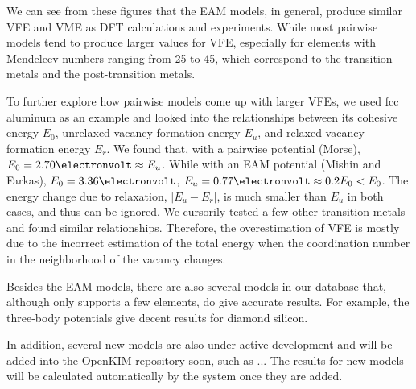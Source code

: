 \documentclass[%
 reprint,
 amsmath,amssymb,
 aps,
]{revtex4-1}
\begin{document}
We can see from these figures that the EAM models, in general, produce similar VFE and VME as DFT calculations and experiments.
While most pairwise models tend to produce larger values for VFE, especially for elements with Mendeleev numbers ranging from 25 to 45, which correspond to the transition metals and the post-transition metals.

To further explore how pairwise models come up with larger VFEs, we used fcc aluminum as an example and looked into the relationships between its cohesive energy $E_0$, unrelaxed vacancy formation energy $E_u$, and relaxed vacancy formation energy $E_r$.
We found that, with a pairwise potential (Morse), $E_0 = 2.70\electronvolt \approx E_u$.
While with an EAM potential (Mishin and Farkas), $E_0 = 3.36\electronvolt$, $E_u = 0.77\electronvolt \approx 0.2E_0 < E_0$.
The energy change due to relaxation, $|E_u-E_r|$, is much smaller than $E_u$ in both cases, and thus can be ignored.
We cursorily tested a few other transition metals and found similar relationships.
Therefore, the overestimation of VFE is mostly due to the incorrect estimation of the total energy when the coordination number in the neighborhood of the vacancy changes.

Besides the EAM models, there are also several models in our database that, although only supports a few elements, do give accurate results.
For example, the three-body potentials give decent results for diamond silicon.

In addition, several new models are also under active development and will be added into the OpenKIM repository soon, such as ...
The results for new models will be calculated automatically by the system once they are added.
\end{document}
